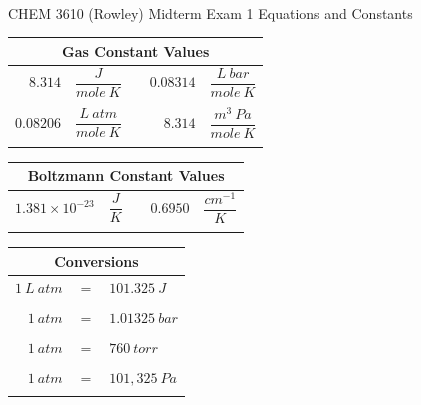 \documentclass[12pt, letterpaper]{memoir}
\begin{document}
\newpage
\pagestyle{empty}
~

\vspace{-3em}
\begin{center}
	{\LARGE CHEM 3610 (Rowley) Midterm Exam 1 Equations and Constants}
\end{center}

\noindent
\begin{minipage}{0.57\linewidth}
	\begin{mdframed}
		\begin{tabular}{rlcrl}
			\multicolumn{5}{c}{Gas Constant Values}                                       \\ \midrule
			$8.314$   & $\dfrac{J}{mole~K}$     &  & $0.08314$ & $\dfrac{L~bar}{mole~K}$  \\ \\
			$0.08206$ & $\dfrac{L~atm}{mole~K}$ &  & $8.314$   & $\dfrac{m^3~Pa}{mole~K}$ \\ \\
		\end{tabular}
		\begin{tabular}{rlcrl}
			\multicolumn{5}{c}{Boltzmann Constant Values}                                 \\ \midrule
			$1.381 \times 10^{-23}$ & $\dfrac{J}{K}$ &  & $0.6950$ & $\dfrac{cm^{-1}}{K}$ \\ \\
		\end{tabular}
	\end{mdframed}
\end{minipage}
\hspace{20pt}
\begin{minipage}{0.4\linewidth}
	\begin{mdframed}
		\begin{tabular}{rcl}
			\multicolumn{3}{c}{Conversions}  \\ \midrule
			$1~L~atm $ & $=$ & $101.325~J$   \\ \\
			$1~atm $   & $=$ & $1.01325~bar$ \\ \\
			$1~atm $   & $=$ & $760~torr$    \\ \\
			$1~atm $   & $=$ & $101,325~Pa$  \\ \\
		\end{tabular}
	\end{mdframed}
\end{minipage}
\end{document}
